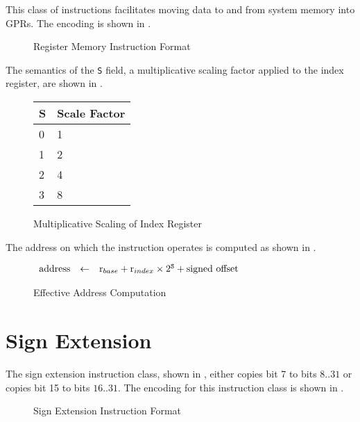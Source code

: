This class of instructions facilitates moving data to and from system
memory into \acp{GPR}.  The encoding is shown in
.

\begin{figure}[H]
  \centering
    \usebox{\regmemtypebox}
    \caption{Register Memory Instruction Format}
    \label{fig:register-memory-format}
\end{figure}

The semantics of the \texttt{S} field, a multiplicative scaling factor
applied to the index register, are shown in
.

\begin{figure}[H]
  \centering
  \begin{tabular}{l|l}
    S &  Scale Factor\\
    \hline
    0 & 1 \\
    1 & 2 \\
    2 & 4 \\
    3 & 8
  \end{tabular}
  \caption{Multiplicative Scaling of Index Register}
  \label{fig:register-memory-scale}
\end{figure}

The address on which the instruction operates is computed as shown
 in .

\begin{figure}[H]
  \centering
    \begin{math}
      \begin{array}{lcl}
        \textrm{address} & \leftarrow & \textrm{r}_{base} + \textrm{r}_{index} \times 2^{\texttt{S}} + \textrm{signed offset} \\
      \end{array}
    \end{math}
  \caption{Effective Address Computation}\label{fig:register-memory-address}
\end{figure}


\section{Sign Extension}

The sign extension instruction class, shown in
, either copies bit 7 to bits ${8..31}$ or
copies bit 15 to bits ${16..31}$.  The encoding for this instruction
class is shown in .

\begin{figure}[H]
  \centering
    \usebox{\exttypebox}
    \caption{Sign Extension Instruction Format}
    \label{fig:sign-extend-format}
\end{figure}

